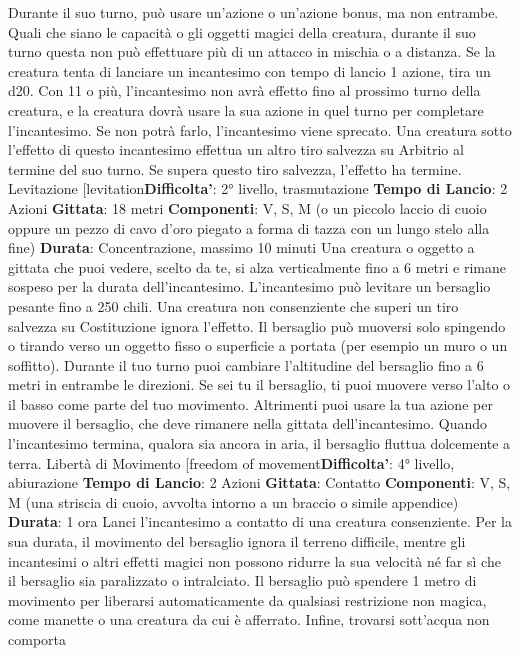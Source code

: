 \begin{multicols}{2}
Durante il suo turno, può usare un’azione o un’azione
bonus, ma non entrambe. Quali che siano le capacità o
gli oggetti magici della creatura, durante il suo turno
questa non può effettuare più di un attacco in mischia o
a distanza.
Se la creatura tenta di lanciare un incantesimo con
tempo di lancio 1 azione, tira un d20. Con 11 o più,
l’incantesimo non avrà effetto fino al prossimo turno
della creatura, e la creatura dovrà usare la sua azione
in quel turno per completare l’incantesimo. Se non potrà
farlo, l’incantesimo viene sprecato.
Una creatura sotto l’effetto di questo incantesimo
effettua un altro tiro salvezza su Arbitrio al termine
del suo turno. Se supera questo tiro salvezza, l’effetto
ha termine.
Levitazione
[levitation\textbf{Difficolta'}:
2° livello, trasmutazione
\textbf{Tempo di Lancio}: 2 Azioni
\textbf{Gittata}: 18 metri
\textbf{Componenti}: V, S, M (o un piccolo laccio di cuoio
oppure un pezzo di cavo d’oro piegato a forma di tazza
con un lungo stelo alla fine)
\textbf{Durata}: Concentrazione, massimo 10 minuti
Una creatura o oggetto a gittata che puoi vedere, scelto
da te, si alza verticalmente fino a 6 metri e rimane
sospeso per la durata dell’incantesimo. L’incantesimo
può levitare un bersaglio pesante fino a 250 chili. Una
creatura non consenziente che superi un tiro salvezza
su Costituzione ignora l’effetto.
Il bersaglio può muoversi solo spingendo o tirando
verso un oggetto fisso o superficie a portata (per
esempio un muro o un soffitto). Durante il tuo turno puoi
cambiare l’altitudine del bersaglio fino a 6 metri in
entrambe le direzioni. Se sei tu il bersaglio, ti puoi
muovere verso l’alto o il basso come parte del tuo
movimento. Altrimenti puoi usare la tua azione per
muovere il bersaglio, che deve rimanere nella gittata
dell’incantesimo.
Quando l’incantesimo termina, qualora sia ancora in
aria, il bersaglio fluttua dolcemente a terra.
Libertà di Movimento
[freedom of movement\textbf{Difficolta'}:
4° livello, abiurazione
\textbf{Tempo di Lancio}: 2 Azioni
\textbf{Gittata}: Contatto
\textbf{Componenti}: V, S, M (una striscia di cuoio, avvolta
intorno a un braccio o simile appendice)
\textbf{Durata}: 1 ora
Lanci l’incantesimo a contatto di una creatura
consenziente. Per la sua durata, il movimento del
bersaglio ignora il terreno difficile, mentre gli
incantesimi o altri effetti magici non possono ridurre la
sua velocità né far sì che il bersaglio sia paralizzato o
intralciato.
Il bersaglio può spendere 1 metro di movimento per
liberarsi automaticamente da qualsiasi restrizione non
magica, come manette o una creatura da cui è
afferrato. Infine, trovarsi sott’acqua non comporta

\end{multicols}
